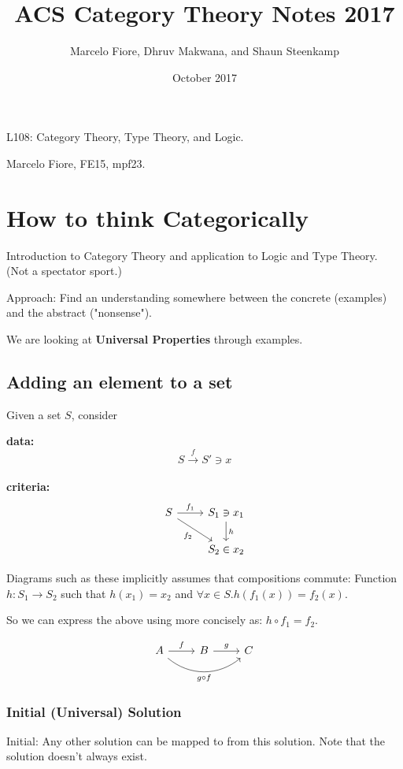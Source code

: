 \documentclass[a4paper, 12pt]{article}
\title{ACS Category Theory Notes 2017}
\date{\nth{5} October 2017}
\author{Marcelo Fiore, Dhruv Makwana, and Shaun Steenkamp}
\theoremstyle{definition}
\begin{document}
\maketitle

L108: Category Theory, Type Theory, and Logic.

Marcelo Fiore, FE15, mpf23.

\section{How to think Categorically}
Introduction to Category Theory and application to Logic and Type Theory. (Not a
spectator sport.)

Approach: Find an understanding somewhere between the concrete (examples) and
the abstract ("nonsense").

We are looking at \textbf{Universal Properties} through examples.

\subsection{Adding an element to a set}
Given a set $S$, consider

\textbf{data:} $$ S \overset{f}{\rightarrow} S' \ni x $$ \\
\textbf{criteria:} $$
    \begin{tikzcd}
        S \arrow[r, "f_1"]
          \arrow[dr, swap, "f_2"]
          &
        S_1 \ni x_1 \arrow[d, "h"]
          \\
          {}&
        S_2 \in x_2
    \end{tikzcd}
$$

Diagrams such as these implicitly assumes that compositions commute:
Function $h : S_1 \rightarrow S_2$ such that $h(x_1) = x_2$ and $\forall x \in S
. h(f_1(x)) = f_2(x)$.

So we can express the above using more concisely as: $h \circ f_1 = f_2$.

$$
\begin{tikzcd}
    A \arrow[r, "f"] \arrow[rr, swap, bend right=40, "g \circ f"] & B \arrow[r, "g"] & C
\end{tikzcd}
$$

\subsubsection*{Initial (Universal) Solution}
Initial: Any other solution can be mapped to from this solution. Note that the
solution doesn't always exist.
\end{document}
